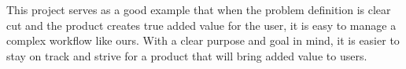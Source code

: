 \documentclass[a4paper,12pt,bibliography=totoc,numbers=noenddot,sfdefaults=false,abstract=true,notitlepage]{scrartcl} %
\begin{document}
	This project serves as a good example that when the problem definition is clear cut and the product creates true added value for the user, it is easy to manage a complex workflow like ours. With a clear purpose and goal in mind, it is easier to stay on track and strive for a product that will bring added value to users.
	
	\FloatBarrier
	\printbibliography
	
	
	
	

	
	
	\clearpage
	\setcounter{secnumdepth}{3} %
	\appendix %
	
	\renewcommand{\thefigure}{S\arabic{figure}}
	\setcounter{figure}{0}
	\renewcommand{\thetable}{S\arabic{table}}
	\setcounter{table}{0}
	
	\renewcommand{\thepage}{Appendix \Roman{page}} %
	
	\label{------APPENDIX------} %
	
	\FloatBarrier
	
	\clearpage
	
	
	
	
	
\end{document}
